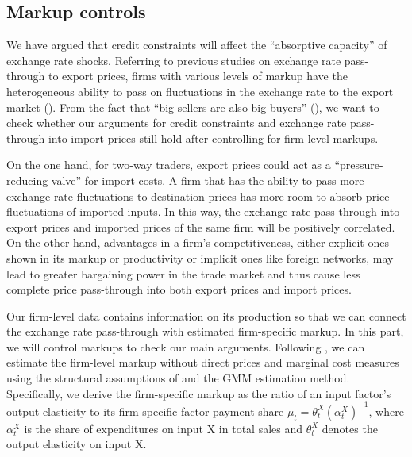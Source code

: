 \subsection{Markup controls}

We have argued that credit constraints will affect the ``absorptive capacity'' of exchange rate shocks. Referring to previous studies on exchange rate pass-through to export prices, firms with various levels of markup have the heterogeneous ability to pass on fluctuations in the exchange rate to the export market (\cite{aik2019}). From the fact that ``big sellers are also big buyers'' (\cite{aik2014}), we want to check whether our arguments for credit constraints and exchange rate pass-through into import prices still hold after controlling for firm-level markups.

On the one hand, for two-way traders, export prices could act as a ``pressure-reducing valve'' for import costs. A firm that has the ability to pass more exchange rate fluctuations to destination prices has more room to absorb price fluctuations of imported inputs. In this way, the exchange rate pass-through into export prices and imported prices of the same firm will be positively correlated. On the other hand, advantages in a firm's competitiveness, either explicit ones shown in its markup or productivity or implicit ones like foreign networks, may lead to greater bargaining power in the trade market and thus cause less complete price pass-through into both export prices and import prices.

Our firm-level data contains information on its production so that we can connect the exchange rate pass-through with estimated firm-specific markup. In this part, we will control markups to check our main arguments. Following \cite{bkl2021}, we can estimate the firm-level markup without direct prices and marginal cost measures using the structural assumptions of \cite{dlw2012} and the GMM estimation method. Specifically, we derive the firm-specific markup as the ratio of an input factor's output elasticity to its firm-specific factor payment share $\mu_{t}=\theta_{t}^{X}\left(\alpha_{t}^{X}\right)^{-1}$, where $\alpha_{t}^{X}$ is the share of expenditures on input X in total sales and $\theta^X_t$ denotes the output elasticity on input X. 

